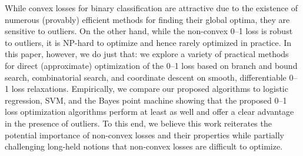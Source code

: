While convex losses for binary classification are attractive due to
the existence of numerous (provably) efficient methods for finding
their global optima, they are sensitive to outliers.  On the other
hand, while the non-convex 0--1 loss is robust to outliers, it is
NP-hard to optimize and hence rarely optimized in practice.  In this
paper, however, we do just that: we explore a variety of practical
methods for direct (approximate) optimization of the 0--1 loss based
on branch and bound search, combinatorial search, and coordinate
descent on smooth, differentiable 0--1 loss relaxations.  Empirically,
we compare our proposed algorithms to logistic regression, SVM, and
the Bayes point machine showing that the proposed 0--1 loss
optimization algorithms perform at least as well and offer a clear
advantage in the presence of outliers.  To this end, we believe this
work reiterates the potential importance of non-convex losses and
their properties while partially challenging long-held notions that
non-convex losses are difficult to optimize.
